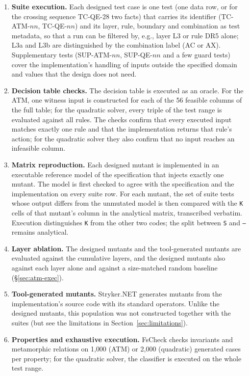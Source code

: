 \documentclass[11pt,a4paper]{article}
\begin{document}
\begin{enumerate}[label=(\roman*)]
    \item \textbf{Suite execution.} Each designed test case is one test
    (one data row, or for the crossing sequence TC-QE-28 two facts) that
    carries its identifier (TC-ATM-\(nn\), TC-QE-\(nn\)) and its layer, rule,
    boundary and combination as test metadata, so that a run can be filtered
    by, e.g., layer L3 or rule DR5 alone; L3a and L3b are distinguished by
    the combination label (AC or AX). Supplementary tests (SUP-ATM-\(nn\),
    SUP-QE-\(nn\) and a few guard tests) cover the implementation's handling
    of inputs outside the specified domain and values that the design does
    not need.
    \item \textbf{Decision table checks.} The decision table is executed as
    an oracle. For the ATM, one witness input is constructed for each of the
    56 feasible columns of the full table; for the quadratic solver, every
    triple of the test range is evaluated against all rules. The checks
    confirm that every executed input matches exactly one rule and that the
    implementation returns that rule's action; for the quadratic solver they
    also confirm that no input reaches an infeasible column.
    \item \textbf{Matrix reproduction.} Each designed mutant is implemented
    in an executable reference model of the specification that injects
    exactly one mutant. The model is first checked to agree with the
    specification and the implementation on every suite row. For each
    mutant, the set of suite tests whose output differs from the unmutated
    model is then compared with the \texttt{K} cells of that mutant's column
    in the analytical matrix, transcribed verbatim. Execution distinguishes
    \texttt{K} from the other two codes; the split between \texttt{S} and
    \texttt{--} remains analytical.
    \item \textbf{Layer ablation.} The designed mutants and the
    tool-generated mutants are evaluated against the cumulative layers, and
    the designed mutants also against each layer alone and against a
    size-matched random baseline (\S\ref{sec:atm-exec}).
    \item \textbf{Tool-generated mutants.} Stryker.NET generates mutants from
    the implementation's source code with its standard operators. Unlike the
    designed mutants, this population was not constructed together with the
    suites (but see the limitations in Section~\ref{sec:limitations}).
    \item \textbf{Properties and exhaustive execution.} FsCheck checks
    invariants and metamorphic relations \cite{chen2018} on 1{,}000 (ATM) or 2{,}000
    (quadratic) generated cases per property; for the quadratic solver, the
    classifier is executed on the whole test range.
\end{enumerate}
\end{document}
